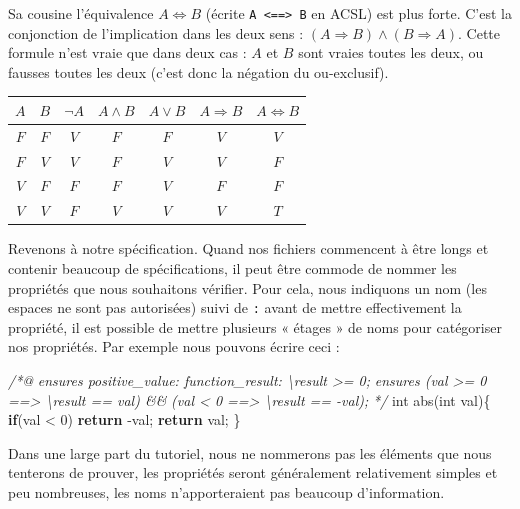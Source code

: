 \documentclass[12pt,francais,]{scrbook}
\newenvironment{Shaded}{}{}
\newcommand{\KeywordTok}[1]{\textcolor[rgb]{0.00,0.44,0.13}{\textbf{{#1}}}}
\newcommand{\DataTypeTok}[1]{\textcolor[rgb]{0.56,0.13,0.00}{{#1}}}
\newcommand{\DecValTok}[1]{\textcolor[rgb]{0.25,0.63,0.44}{{#1}}}
\newcommand{\CommentTok}[1]{\textcolor[rgb]{0.38,0.63,0.69}{\textit{{#1}}}}
\newcommand{\NormalTok}[1]{{#1}}
\newenvironment{zdsblock}[1]{%
  \tcolorbox[beamer,%
    noparskip,breakable,
    colback=LightBlue,colframe=DarkBlue,%
    colbacklower=DarkBlue,%
    title=#1]
}{\endtcolorbox}
\begin{document}
Sa cousine l'équivalence \(A \Leftrightarrow B\) (écrite
\texttt{A\ \textless{}==\textgreater{}\ B} en ACSL) est plus forte.
C'est la conjonction de l'implication dans les deux sens :
\((A \Rightarrow B) \wedge (B \Rightarrow A)\). Cette formule n'est
vraie que dans deux cas : \(A\) et \(B\) sont vraies toutes les deux, ou
fausses toutes les deux (c'est donc la négation du ou-exclusif).

\begin{zdsblock}{Information}
\begin{longtable}[]{@{}ccccccc@{}}
\(A\) & \(B\) & \(\neg A\) & \(A \wedge B\) & \(A \vee B\) & \(A \Rightarrow B\) & \(A \Leftrightarrow B\)\tabularnewline
\midrule
\endhead
\(F\) & \(F\) & \(V\) & \(F\) & \(F\) & \(V\) &\(V\)\tabularnewline
\(F\) & \(V\) & \(V\) & \(F\) & \(V\) & \(V\) &\(F\)\tabularnewline
\(V\) & \(F\) & \(F\) & \(F\) & \(V\) & \(F\) &\(F\)\tabularnewline
\(V\) & \(V\) & \(F\) & \(V\) & \(V\) & \(V\) &\(T\)\tabularnewline
\bottomrule
\end{longtable}
\end{zdsblock}

Revenons à notre spécification. Quand nos fichiers commencent à être
longs et contenir beaucoup de spécifications, il peut être commode de
nommer les propriétés que nous souhaitons vérifier. Pour cela, nous
indiquons un nom (les espaces ne sont pas autorisées) suivi de
\texttt{:} avant de mettre effectivement la propriété, il est possible
de mettre plusieurs « étages » de noms pour catégoriser nos propriétés.
Par exemple nous pouvons écrire ceci :

\begin{footnotesize}\begin{Shaded}
\begin{Highlighting}[]
\CommentTok{/*@}
\CommentTok{  ensures positive_value: function_result: \textbackslash{}result >= 0;}
\CommentTok{  ensures (val >= 0 ==> \textbackslash{}result == val) && }
\CommentTok{          (val < 0 ==> \textbackslash{}result == -val);}
\CommentTok{*/}
\DataTypeTok{int} \NormalTok{abs(}\DataTypeTok{int} \NormalTok{val)\{}
  \KeywordTok{if}\NormalTok{(val < }\DecValTok{0}\NormalTok{) }\KeywordTok{return} \NormalTok{-val;}
  \KeywordTok{return} \NormalTok{val;}
\NormalTok{\}}
\end{Highlighting}
\end{Shaded}\end{footnotesize}

Dans une large part du tutoriel, nous ne nommerons pas les éléments que
nous tenterons de prouver, les propriétés seront généralement
relativement simples et peu nombreuses, les noms n'apporteraient pas
beaucoup d'information.
\end{document}
